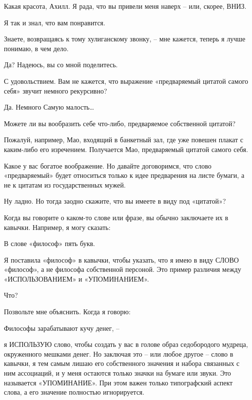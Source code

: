 \documentclass[../main.tex]{subfiles}
\begin{document}
\begin{Dialogue}

Какая красота, Ахилл. Я рада, что вы привели меня наверх \--- или, скорее, ВНИЗ.

 Я так и знал, что вам понравится.

 Знаете, возвращаясь к тому хулиганскому звонку, \--- мне кажется, теперь я лучше понимаю, в чем дело.

 Да? Надеюсь, вы со мной поделитесь.

 С удовольствием. Вам не кажется, что выражение «предваряемый цитатой самого себя» звучит немного рекурсивно?

 Да. Немного Самую малость\ldots{}

 Можете ли вы вообразить себе что-либо, предваряемое собственной цитатой?

 Пожалуй, например, Мао, входящий в банкетный зал, где уже повешен плакат с каким-либо его изречением. Получается Мао, предваряемый цитатой самого себя.

 Какое у вас богатое воображение. Но давайте договоримся, что слово «предваряемый» будет относиться только к идее предварения на листе бумаги, а не к цитатам из государственных мужей.

 Ну ладно. Но тогда заодно скажите, что вы имеете в виду под «цитатой»?

 Когда вы говорите о каком-то слове или фразе, вы обычно заключаете их в кавычки. Например, я могу сказать:

В слове «философ» пять букв.

Я поставила «философ» в кавычки, чтобы указать, что я имею в виду СЛОВО «философ», а не философа собственной персоной. Это пример различия между «ИСПОЛЬЗОВАНИЕМ» и «УПОМИНАНИЕМ».

 Что?

 Позвольте мне объяснить. Когда я говорю:

Философы зарабатывают кучу денег, \---

я ИСПОЛЬЗУЮ слово, чтобы создать у вас в голове образ седобородого мудреца, окруженного мешками денег. Но заключая это \--- или любое другое \--- слово в кавычки, я тем самым лишаю его собственного значения и набора связанных с ним ассоциаций, и у меня остаются только значки на бумаге или звуки. Это называется «УПОМИНАНИЕ». При этом важен только типографский аспект слова, а его значение полностью игнорируется.


\end{Dialogue}
\end{document}
